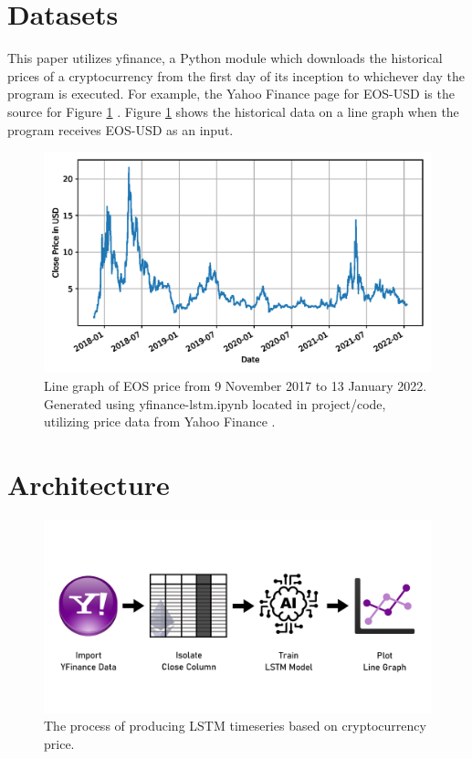 \section{Datasets}

This paper utilizes yfinance, a Python module which downloads the historical prices of a cryptocurrency from the first day of its inception to whichever day the program is executed. For example, the Yahoo Finance page for EOS-USD is the source for Figure \ref{fig:eos-price} \cite{c4}. Figure \ref{fig:eos-price} shows the historical data on a line graph when the program receives EOS-USD as an input.

\begin{figure}[htb]
\includegraphics[width=\columnwidth]{images/EOS-USD-price.png}
\caption{Line graph of EOS price from 9 November 2017 to 13 January 2022. Generated using yfinance-lstm.ipynb \cite{c13} located in project/code, utilizing price data from Yahoo Finance \cite{c4}.}
\label{fig:eos-price}
\end{figure}

\section{Architecture}

\begin{figure}[htb]
\includegraphics[width=\columnwidth]{images/architecture-process.png}
\caption{The process of producing LSTM timeseries based on cryptocurrency price.}
\label{fig:arch-process}
\end{figure}

